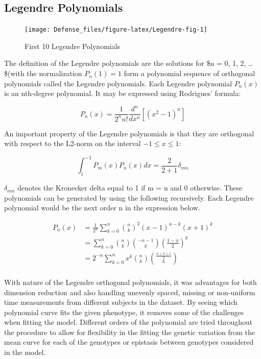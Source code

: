 \documentclass[11pt,]{book}
\theoremstyle{definition}
\theoremstyle{definition}
\theoremstyle{remark}
\begin{document}
\subsection{Legendre Polynomials}\label{legendre-polynomials}

\begin{figure}

{\centering \texttt{[image: Defense\_files/figure-latex/Legendre-fig-1]} 

}

\caption{First 10 Legendre Polynomials}\label{fig:Legendre-fig}
\end{figure}

The definition of the Legendre polynomials are the solutions for \$n =
0, 1, 2, \dots \$(with the normalization \(P_n(1) = 1\) form a
polynomial sequence of orthogonal polynomials called the Legendre
polynomials. Each Legendre polynomial \(P_n(x)\) is an nth-degree
polynomial. It may be expressed using Rodrigues' formula:

\begin{equation}
P_n(x) = \frac{1}{2^nn!} \frac{d^n}{dx^n}[(x^2-1)^n]
\label{eq:rodrigues-formula}
\end{equation}

An important property of the Legendre polynomials is that they are
orthogonal with respect to the L2-norm on the interval
\(−1 \le x \le 1\):

\begin{equation}
\int_1^{-1} P_m(x)P_n(x)dx = \frac{2}{2+1}\delta_{mn}
\label{eq:orthg-leg}
\end{equation}

\(\delta_{mn}\) denotes the Kronecker delta equal to 1 if m = n and 0
otherwise. These polynomials can be generated by using the following
recursively. Each Legendre polynomial would be the next order n in the
expression below.

\begin{equation}
\begin{split}
P_n(x) & = \frac{1}{2^n}\sum_{k=0}^{n}{{n}\choose{k}}^2(x-1)^{n-k}(x+1)^k \\
& = \sum_{k=0}^{n}{{n}\choose{k}}{{-n-1}\choose{k}}{\left(\frac{1-x}{2}\right)}^k \\
& = 2^{-n}\sum_{k=0}^{n} x^k {{n}\choose{k}}{{\frac{n+k+1}{2}}\choose{k}} \\
\end{split}
\label{eq:leg-eq}
\end{equation}

With nature of the Legendre orthogonal polynomials, it was advantages
for both dimension reduction and also handling unevenly spaced, missing
or non-uniform time measurements from different subjects in the dataset.
By seeing which polynomial curve fits the given phenotype, it removes
some of the challenges when fitting the model. Different orders of the
polynomial are tried throughout the procedure to allow for flexibility
in the fitting the genetic variation from the mean curve for each of the
genotypes or epistasis between genotypes considered in the model.
\end{document}
